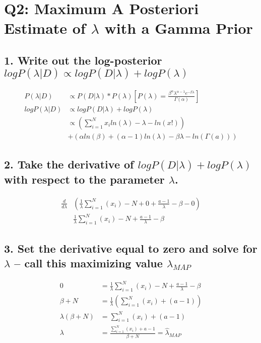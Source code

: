 \documentclass{article}
\begin{document}
    \section*{Q2: Maximum A Posteriori Estimate of $\lambda$ with a Gamma Prior}

            \subsection*{1. Write out the log-posterior $logP (\lambda|D) \propto logP (D|\lambda) + logP (\lambda)$}

                \begin{align*}
                    P(\lambda|D) &\propto P(D|\lambda)*P(\lambda) \left[P(\lambda) = \frac{\beta^\alpha\lambda^{\alpha-1}e^{-\beta\lambda}}{\Gamma(\alpha)}\right]\\
                    logP(\lambda|D) &\propto logP(D|\lambda) + logP(\lambda)\\
                    &\propto (\sum_{i=1}^{N} x_iln(\lambda) - \lambda - ln(x!))\\& + (\alpha ln(\beta) + (\alpha-1)ln(\lambda) - \beta\lambda-ln(\Gamma(a)))
                \end{align*}
            \subsection*{2. Take the derivative of $logP (D|\lambda) + logP (\lambda)$ with respect to the parameter $\lambda$.}
                \begin{align*}
                    \frac{d}{d\lambda} & \left( \frac{1}{\lambda}\sum_{i=1}^N (x_i) - N + 0 +\frac{a-1}{\lambda} - \beta - 0   \right)\\
                    & \frac{1}{\lambda}\sum_{i=1}^N (x_i) - N + \frac{a-1}{\lambda} - \beta
                \end{align*}

            \subsection*{3. Set the derivative equal to zero and solve for $\lambda$ – call this maximizing value $\hat{\lambda}_{MAP}$}
                \begin{align*}
                    0 &= \frac{1}{\lambda}\sum_{i=1}^N (x_i) - N + \frac{a-1}{\lambda} - \beta\\
                    \beta + N &= \frac{1}{\lambda}\left(\sum_{i=1}^N (x_i) + (a-1)\right)\\
                    \lambda(\beta + N) &=\sum_{i=1}^N (x_i) + (a-1)\\
                    \lambda &=\frac{\sum_{i=1}^N (x_i) + a-1}{\beta+N} = \hat{\lambda}_{MAP}
                \end{align*}
\end{document}
